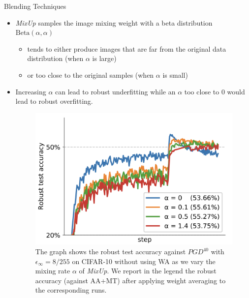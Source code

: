 \begin{frame}{Blending Techniques}
    \begin{itemize}
        \item \textit{MixUp} samples the image mixing weight with a beta distribution $\text{Beta}(\alpha, \alpha)$
        \begin{itemize}
            \item tends to either produce images that are far from the original data distribution (when $\alpha$ is large)
            \item or too close to the original samples (when $\alpha$ is small)
        \end{itemize}
        \item Increasing $\alpha$ can lead to robust underfitting while an $\alpha$ too close to 0 would lead to robust overfitting.
        \begin{figure}
            \centering
            \includegraphics[height=0.4\textheight]{pic/mixup.png}
            \caption{The graph shows the robust test accuracy against $PGD^{40}$ with $\epsilon_\infty = 8/255$ on CIFAR-10 without using WA as we vary the mixing rate $\alpha$ of \textit{MixUp}. We report in the legend the robust accuracy (against AA+MT) after applying weight averaging to the corresponding runs.}
            \label{fig:fig5}
        \end{figure}
    \end{itemize}
\end{frame}

